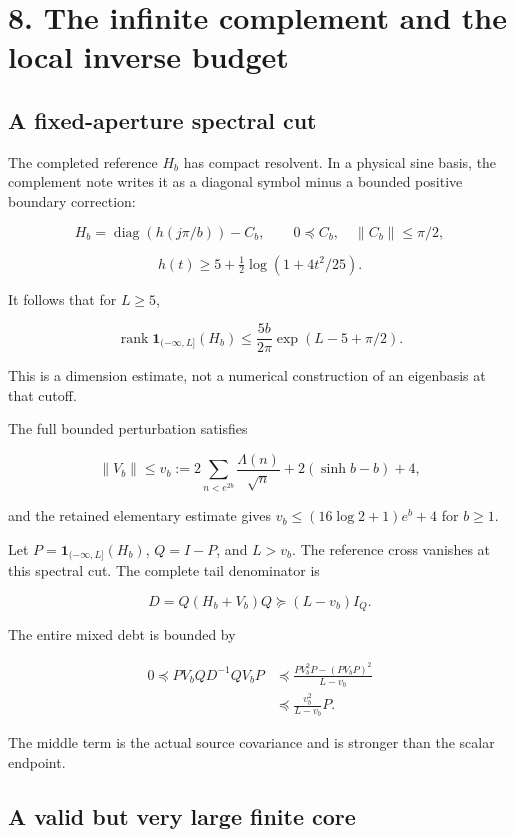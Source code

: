 \documentclass[
  10pt,
  a4paper,
  10pt,
  oneside,
  openany]{book}
\begin{document}
\section{8. The infinite complement and the local inverse
budget}\label{ch-tail}

\subsection{A fixed-aperture spectral
cut}\label{a-fixed-aperture-spectral-cut}

The completed reference \(H_b\) has compact resolvent. In a physical
sine basis, the complement note writes it as a diagonal symbol minus a
bounded positive boundary correction:

\[
H_b=\operatorname{diag}(h(j\pi/b))-C_b,
\qquad 0\preceq C_b,\quad\|C_b\|\le\pi/2,
\tag{8.1}\label{eq:8.1}
\]

\[
h(t)\ge5+\tfrac12\log(1+4t^2/25).
\tag{8.2}\label{eq:8.2}
\]

It follows that for \(L\ge5\),

\[
\operatorname{rank}\mathbf1_{(-\infty,L]}(H_b)
\le\frac{5b}{2\pi}\exp(L-5+\pi/2).
\tag{8.3}\label{eq:8.3}
\]

This is a dimension estimate, not a numerical construction of an
eigenbasis at that cutoff.

The full bounded perturbation satisfies

\[
\|V_b\|\le v_b
:=2\sum_{n<e^{2b}}\frac{\Lambda(n)}{\sqrt n}
+2(\sinh b-b)+4,
\tag{8.4}\label{eq:8.4}
\]

and the retained elementary estimate gives \(v_b\le(16\log2+1)e^b+4\)
for \(b\ge1\).

Let \(P=\mathbf1_{(-\infty,L]}(H_b)\), \(Q=I-P\), and \(L>v_b\). The
reference cross vanishes at this spectral cut. The complete tail
denominator is

\[
D=Q(H_b+V_b)Q\succeq(L-v_b)I_Q.
\tag{8.5}\label{eq:8.5}
\]

The entire mixed debt is bounded by

\[
\begin{aligned}
0\preceq PV_bQD^{-1}QV_bP
&\preceq\frac{PV_b^2P-(PV_bP)^2}{L-v_b}\\
&\preceq\frac{v_b^2}{L-v_b}P.
\end{aligned}
\tag{8.6}\label{eq:8.6}
\]

The middle term is the actual source covariance and is stronger than the
scalar endpoint.

\subsection{A valid but very large finite
core}\label{a-valid-but-very-large-finite-core}
\end{document}
